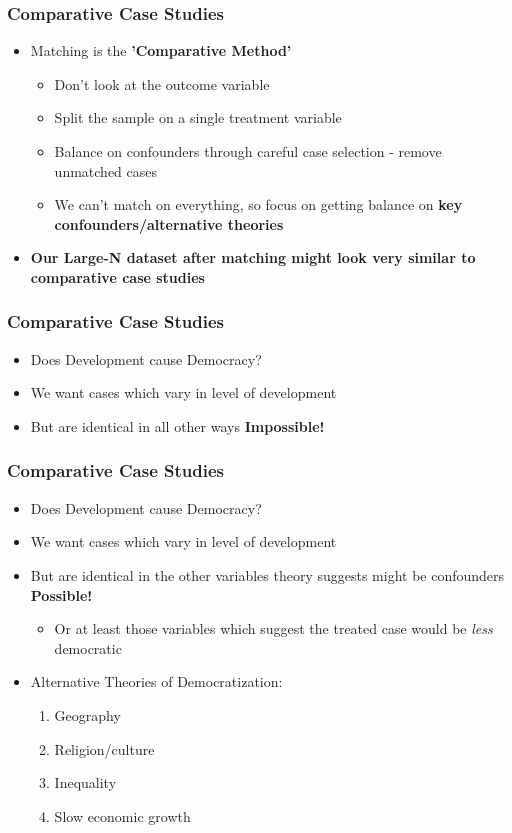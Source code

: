 \documentclass[xcolor=x11names,compress]{beamer}\usepackage[]{graphicx}\usepackage[]{color}
\renewcommand{\(}{\begin{columns}}
\renewcommand{\)}{\end{columns}}
\newcommand{\<}[1]{\begin{column}{#1}}
\renewcommand{\>}{\end{column}}
\begin{document}
\begin{frame}
\frametitle{Comparative Case Studies}
\begin{itemize}
\item Matching is the \textbf{'Comparative Method'}
\begin{itemize}
\item Don't look at the outcome variable
\pause
\item Split the sample on a single treatment variable
\pause
\item Balance on confounders through careful case selection - remove unmatched cases
\pause
\item We can't match on everything, so focus on getting balance on \textbf{key confounders/alternative theories}
\pause
\end{itemize}
\item \textbf{Our Large-N dataset after matching might look very similar to comparative case studies}
\end{itemize}
\end{frame}

\begin{frame}
\frametitle{Comparative Case Studies}
\begin{itemize}
\item Does Development cause Democracy?
\pause
\item We want cases which vary in level of development
\pause
\item But are identical in all other ways \pause \textbf{Impossible!}
\end{itemize}
\end{frame}

\begin{frame}
\frametitle{Comparative Case Studies}
\begin{itemize}
\item Does Development cause Democracy?
\item We want cases which vary in level of development
\item But are identical in the other variables theory suggests might be confounders \pause \textbf{Possible!}
\begin{itemize}
\item Or at least those variables which suggest the treated case would be \textit{less} democratic
\end{itemize}
\pause
\item Alternative Theories of Democratization:
\begin{enumerate}
\item Geography
\pause
\item Religion/culture
\pause
\item Inequality
\pause
\item Slow economic growth
\end{enumerate}
\end{itemize}
\end{frame}
\end{document}
